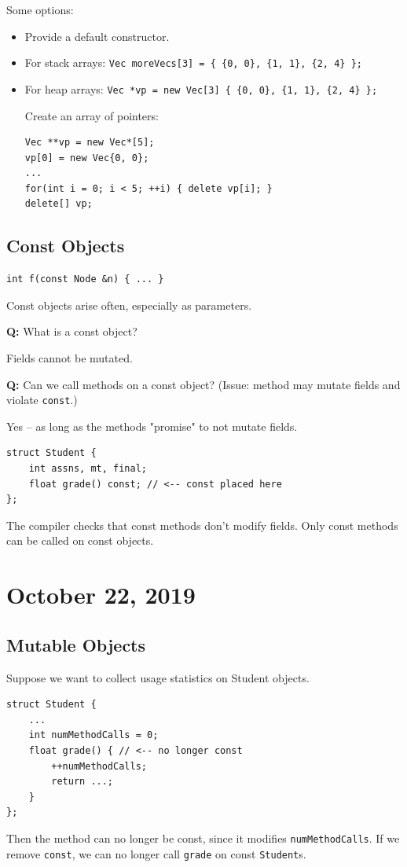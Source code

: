 \documentclass[11pt]{article}
\theoremstyle{definition}
\begin{document}
Some options: \vspace{-0.25cm}
\begin{itemize}
\item Provide a default constructor.
\item For stack arrays: {\tt Vec moreVecs[3] = \{ \{0, 0\}, \{1, 1\}, \{2, 4\} \};}
\item For heap arrays: {\tt Vec *vp = new Vec[3] \{ \{0, 0\}, \{1, 1\}, \{2, 4\} \};}
    
Create an array of pointers:
\begin{lstlisting}
Vec **vp = new Vec*[5];
vp[0] = new Vec{0, 0};
...
for(int i = 0; i < 5; ++i) { delete vp[i]; }
delete[] vp;
\end{lstlisting}
\end{itemize}

\subsection{Const Objects}
\begin{lstlisting}
int f(const Node &n) { ... }
\end{lstlisting}
Const objects arise often, especially as parameters.

{\bf Q:} What is a const object?

Fields cannot be mutated.

{\bf Q:} Can we call methods on a const object? (Issue: method may mutate fields and violate {\tt const}.)

Yes -- as long as the methods "promise" to not mutate fields. 
\begin{lstlisting}
struct Student {
    int assns, mt, final;
    float grade() const; // <-- const placed here
};
\end{lstlisting}
The compiler checks that const methods don't modify fields. Only const methods can be called on const objects.
\newpage

\section{October 22, 2019}

\subsection{Mutable Objects}
Suppose we want to collect usage statistics on {\rm Student} objects.
\begin{lstlisting}
struct Student {
    ...
    int numMethodCalls = 0;
    float grade() { // <-- no longer const
        ++numMethodCalls;
        return ...;
    }
};
\end{lstlisting}
Then the method can no longer be const, since it modifies {\tt numMethodCalls}. If we remove {\tt const}, we can no longer call {\tt grade} on const {\tt Student}s.
\end{document}

